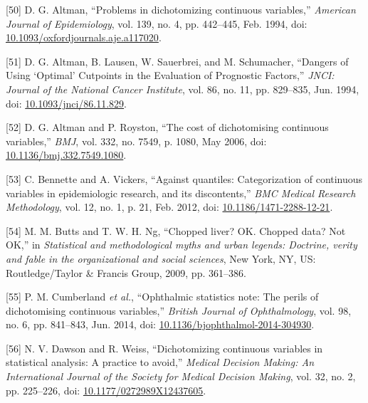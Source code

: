 \documentclass[12pt,PhD,twoside,openright]{muthesis}
\newenvironment{cslreferences}%
  {}%
  {\par}
\begin{document}
\begin{cslreferences}
\leavevmode\hypertarget{ref-altman_problems_1994-1}{}%
{[}50{]} D. G. Altman, ``Problems in dichotomizing continuous variables,'' \emph{American Journal of Epidemiology}, vol. 139, no. 4, pp. 442--445, Feb. 1994, doi: \href{https://doi.org/10.1093/oxfordjournals.aje.a117020}{10.1093/oxfordjournals.aje.a117020}.

\leavevmode\hypertarget{ref-altman_dangers_1994-1}{}%
{[}51{]} D. G. Altman, B. Lausen, W. Sauerbrei, and M. Schumacher, ``Dangers of Using `Optimal' Cutpoints in the Evaluation of Prognostic Factors,'' \emph{JNCI: Journal of the National Cancer Institute}, vol. 86, no. 11, pp. 829--835, Jun. 1994, doi: \href{https://doi.org/10.1093/jnci/86.11.829}{10.1093/jnci/86.11.829}.

\leavevmode\hypertarget{ref-altman_cost_2006-1}{}%
{[}52{]} D. G. Altman and P. Royston, ``The cost of dichotomising continuous variables,'' \emph{BMJ}, vol. 332, no. 7549, p. 1080, May 2006, doi: \href{https://doi.org/10.1136/bmj.332.7549.1080}{10.1136/bmj.332.7549.1080}.

\leavevmode\hypertarget{ref-bennette_against_2012-1}{}%
{[}53{]} C. Bennette and A. Vickers, ``Against quantiles: Categorization of continuous variables in epidemiologic research, and its discontents,'' \emph{BMC Medical Research Methodology}, vol. 12, no. 1, p. 21, Feb. 2012, doi: \href{https://doi.org/10.1186/1471-2288-12-21}{10.1186/1471-2288-12-21}.

\leavevmode\hypertarget{ref-butts_chopped_2009-1}{}%
{[}54{]} M. M. Butts and T. W. H. Ng, ``Chopped liver? OK. Chopped data? Not OK,'' in \emph{Statistical and methodological myths and urban legends: Doctrine, verity and fable in the organizational and social sciences}, New York, NY, US: Routledge/Taylor \& Francis Group, 2009, pp. 361--386.

\leavevmode\hypertarget{ref-cumberland_ophthalmic_2014-1}{}%
{[}55{]} P. M. Cumberland \emph{et al.}, ``Ophthalmic statistics note: The perils of dichotomising continuous variables,'' \emph{British Journal of Ophthalmology}, vol. 98, no. 6, pp. 841--843, Jun. 2014, doi: \href{https://doi.org/10.1136/bjophthalmol-2014-304930}{10.1136/bjophthalmol-2014-304930}.

\leavevmode\hypertarget{ref-dawson_dichotomizing_2012-1}{}%
{[}56{]} N. V. Dawson and R. Weiss, ``Dichotomizing continuous variables in statistical analysis: A practice to avoid,'' \emph{Medical Decision Making: An International Journal of the Society for Medical Decision Making}, vol. 32, no. 2, pp. 225--226, doi: \href{https://doi.org/10.1177/0272989X12437605}{10.1177/0272989X12437605}.


\end{cslreferences}
\end{document}
